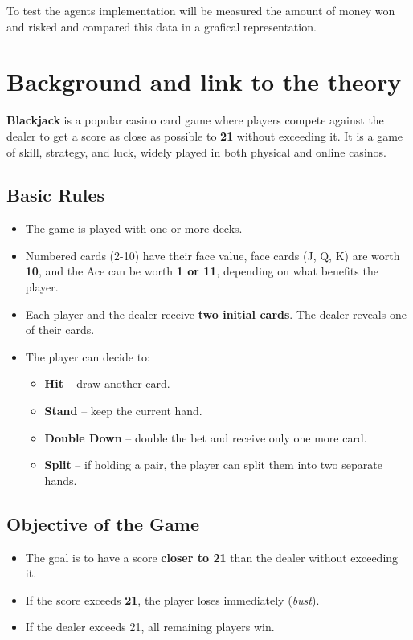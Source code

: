 To test the agents implementation will be measured the amount of money won and risked and compared this data in a grafical representation.

\chapter{Background and link to the theory}

\textbf{Blackjack} is a popular casino card game where players compete against the dealer to get a score as close as possible to \textbf{21} without exceeding it. It is a game of skill, strategy, and luck, widely played in both physical and online casinos.

\section{Basic Rules}

\begin{itemize}
    \item The game is played with one or more decks.
    \item Numbered cards (2-10) have their face value, face cards (J, Q, K) are worth \textbf{10}, and the Ace can be worth \textbf{1 or 11}, depending on what benefits the player.
    \item Each player and the dealer receive \textbf{two initial cards}. The dealer reveals one of their cards.
    \item The player can decide to:
    \begin{itemize}
        \item \textbf{Hit} -- draw another card.
        \item \textbf{Stand} -- keep the current hand.
        \item \textbf{Double Down} -- double the bet and receive only one more card.
        \item \textbf{Split} -- if holding a pair, the player can split them into two separate hands.
    \end{itemize}
\end{itemize}

\section{Objective of the Game}

\begin{itemize}
    \item The goal is to have a score \textbf{closer to 21} than the dealer without exceeding it.
    \item If the score exceeds \textbf{21}, the player loses immediately (\textit{bust}).
    \item If the dealer exceeds 21, all remaining players win.
\end{itemize}

